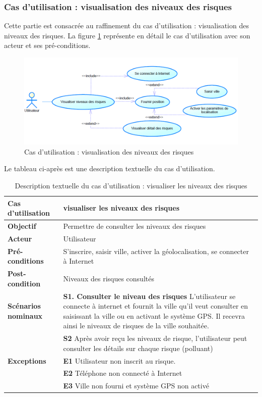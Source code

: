 \subsubsection{Cas d'utilisation : visualisation des niveaux des risques}
\qquad Cette partie est consacrée au raffinement du cas d'utilisation : visualisation des niveaux des risques. La figure \ref{fig2.3} représente en détail le cas d'utilisation avec son acteur et ses pré-conditions.\\

\begin{figure}[!h]
	\begin{center}
		\includegraphics[width=0.64\textheight]{figures/uc_visualisationrisques}
	\end{center}
	\caption{Cas d'utilisation :  visualisation des niveaux des risques}
	\label{fig2.3}
\end{figure}
Le tableau ci-après est une description textuelle du cas d'utilisation.
\begin{table}[!h]
	\caption{Description textuelle du cas d'utilisation : visualiser les niveaux des risques}
	\begin{center}
		\begin{tabular}{|L{4cm}|L{10cm}|}
			\hline
			\textbf{Cas d’utilisation} & visualiser les niveaux des risques\\
			\hline
			\textbf{Objectif} & Permettre de consulter les niveaux des risques\\
			\hline
			\textbf{Acteur} & Utilisateur\\
			\hline
			\textbf{Pré-conditions} & S'inscrire, saisir ville, activer la géolocalisation, se connecter à Internet\\
			\hline
			\textbf{Post-condition} & Niveaux des risques consultés \\
			\hline			
			\textbf{Scénarios nominaux} & \textbf{S1. Consulter le niveau des risques} L'utilisateur se connecte à internet et fournit la ville qu'il veut consulter en saisissant la ville ou en activant le système GPS. Il recevra ainsi le niveaux de risques de la ville souhaitée.\\
			&\textbf{S2} Après avoir reçu les niveaux de risque, l'utilisateur peut consulter les détails sur chaque risque (polluant)\\
			\hline
			\textbf{Exceptions} & \textbf{E1} Utilisateur non inscrit au risque.\\ &\textbf{E2} Téléphone non connecté à Internet\\
			&\textbf{E3} Ville non fourni et système GPS non activé\\
			\hline
		\end{tabular}
	\end{center}
\end{table}
